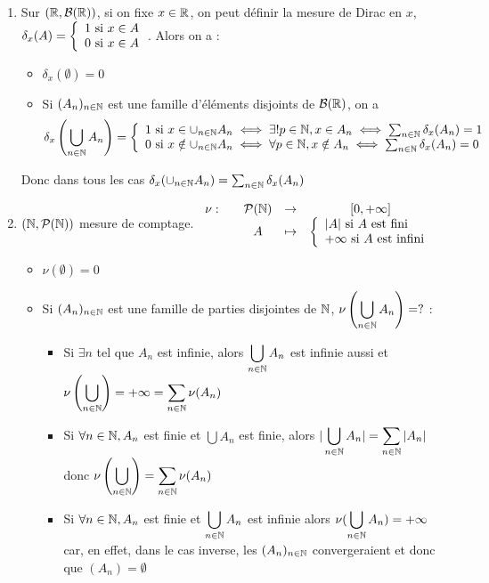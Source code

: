 \documentclass[]{report}
\begin{document}
\begin{ex}{}{}
    \begin{enumerate}
        \item Sur $(\mathbb{R},\mathcal{B}(\mathbb{R}))$, si on fixe $x\in\mathbb{R}$, on peut définir la mesure de Dirac en $x$, $\delta_x(A)=\left\{\begin{array}{ll} 1\text{ si }x\in A\\0\text{ si }x\in A \end{array} \right.$. Alors on a :
        \begin{itemize}
            \item $\delta_x(\emptyset)=0$
            \item Si $(A_n)_{n\in\mathbb{N}}$ est une famille d'éléments disjoints de $\mathcal{B}(\mathbb{R})$, on a
            $$\delta_x\left(\bigcup_{n\in\mathbb{N}}A_n\right)=\left\{\begin{array}{ll} 1\text{ si }x\in\cup_{n\in\mathbb{N}}A_n\iff \exists!p\in\mathbb{N},x\in A_n\iff\sum_{n\in\mathbb{N}}\delta_x(A_n)=1\\
            0\text{ si }x\notin\cup_{n\in\mathbb{N}}A_n\iff \forall p\in\mathbb{N},x\notin A_n\iff\sum_{n\in\mathbb{N}}\delta_x(A_n)=0 \end{array} \right.$$
        \end{itemize}
        Donc dans tous les cas $\delta_x(\cup_{n\in\mathbb{N}}A_n)=\sum_{n\in\mathbb{N}}\delta_x(A_n)$
        \item $(\mathbb{N},\mathcal{P}(\mathbb{N}))$ mesure de comptage. $\begin{array}{ccccc} \nu : & & \mathcal{P}(\mathbb{N}) & \to & [0,+\infty] \\ & & A & \mapsto & \left\{\begin{array}{ll} |A|\text{ si }A\text{ est fini}\\+\infty\text{ si }A\text{ est infini} \end{array} \right. \end{array}$
        \begin{itemize}
            \item $\nu(\emptyset)=0$
            \item Si $(A_n)_{n\in\mathbb{N}}$ est une famille de parties disjointes de $\mathbb{N}$, $\displaystyle{\nu\left(\bigcup_{n\in\mathbb{N}}A_n\right)}=?$ :
            \begin{itemize}
                \item Si $\exists n$ tel que $A_n$ est infinie, alors $\displaystyle{\bigcup_{n\in\mathbb{N}}A_n}$ est infinie aussi et $\displaystyle{\nu\left( \bigcup_{{n\in\mathbb{N}}} \right)=+\infty=\sum_{{n\in\mathbb{N}}}\nu(A_n)}$
                \item Si $\forall{n\in\mathbb{N}},A_n$ est finie et $\bigcup A_n$ est finie, alors $\displaystyle{|\bigcup_{{n\in\mathbb{N}}}A_n|=\sum_{{n\in\mathbb{N}}}|A_n|}$ donc $\displaystyle{\nu\left( \bigcup_{{n\in\mathbb{N}}} \right)=\sum_{{n\in\mathbb{N}}}\nu(A_n)}$
                \item Si $\forall{n\in\mathbb{N}},A_n$ est finie et $\displaystyle{\bigcup_{{n\in\mathbb{N}}}A_n}$ est infinie alors $\displaystyle{\nu(\bigcup_{{n\in\mathbb{N}}}A_n)=+\infty}$ car, en effet, dans le cas inverse, les $(A_n)_{{n\in\mathbb{N}}}$ convergeraient et donc que $(A_n)=\emptyset$ \apcr
            \end{itemize}
        \end{itemize}
    \end{enumerate}
\end{ex}
\end{document}
